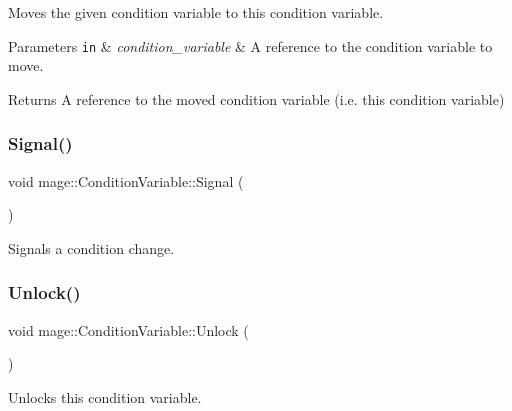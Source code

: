 Moves the given condition variable to this condition variable.


\begin{DoxyParams}[1]{Parameters}
\mbox{\tt in}  & {\em condition\+\_\+variable} & A reference to the condition variable to move. \\
\hline
\end{DoxyParams}
\begin{DoxyReturn}{Returns}
A reference to the moved condition variable (i.\+e. this condition variable) 
\end{DoxyReturn}
\hypertarget{structmage_1_1_condition_variable_ad48673a4f7ea2a28c7ddc77222e5d8cc}{}\label{structmage_1_1_condition_variable_ad48673a4f7ea2a28c7ddc77222e5d8cc} 
\subsubsection{\texorpdfstring{Signal()}{Signal()}}
{\footnotesize\ttfamily void mage\+::\+Condition\+Variable\+::\+Signal (\begin{DoxyParamCaption}{ }\end{DoxyParamCaption})\hspace{0.3cm}{\ttfamily [noexcept]}}

Signals a condition change. \hypertarget{structmage_1_1_condition_variable_a40e853cf65b0c3cb3788d2b8a45448af}{}\label{structmage_1_1_condition_variable_a40e853cf65b0c3cb3788d2b8a45448af} 
\subsubsection{\texorpdfstring{Unlock()}{Unlock()}}
{\footnotesize\ttfamily void mage\+::\+Condition\+Variable\+::\+Unlock (\begin{DoxyParamCaption}{ }\end{DoxyParamCaption})\hspace{0.3cm}{\ttfamily [noexcept]}}

Unlocks this condition variable. \hypertarget{structmage_1_1_condition_variable_a15a1d797032d178c787a385d11522efb}{}\label{structmage_1_1_condition_variable_a15a1d797032d178c787a385d11522efb} 
